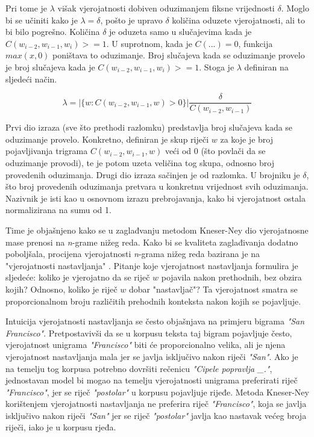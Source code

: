\documentclass[times, utf8, diplomski, numeric]{fer}
\begin{document}
Pri tome je $\lambda$ višak vjerojatnosti dobiven oduzimanjem fiksne vrijednosti $\delta$. Moglo bi se učiniti kako je $\lambda = \delta$, pošto je upravo $\delta$ količina oduzete vjerojatnosti, ali to bi bilo pogrešno. Količina $\delta$ je oduzeta samo u slučajevima kada je $C(w_{i - 2}, w_{i - 1}, w_i) >= 1$. U suprotnom, kada je $C(...) = 0$, funkcija $max(x, 0)$ poništava to oduzimanje. Broj slučajeva kada se oduzimanje provelo je broj slučajeva kada je $C(w_{i - 2}, w_{i - 1}, w_i) >= 1$. Stoga je $\lambda$ definiran na sljedeći način.

\[
\lambda = \left|\{w : C(w_{i - 2}, w_{i - 1}, w) > 0\}\right| \frac{\delta}{C(w_{i - 2}, w_{i - 1})} 
\]

Prvi dio izraza (sve što prethodi razlomku) predstavlja broj slučajeva kada se oduzimanje provelo. Konkretno, definiran je skup riječi $w$ za koje je broj pojavljivanja trigrama $C(w_{i - 2}, w_{i - 1}, w)$ veći od $0$ (što povlači da se oduzimanje provodi), te je potom uzeta veličina tog skupa, odnosno broj provedenih oduzimanja. Drugi dio izraza sačinjen je od razlomka. U brojniku je $\delta$, što broj provedenih oduzimanja pretvara u konkretnu vrijednost svih oduzimanja. Nazivnik je isti kao u osnovnom izrazu prebrojavanja, kako bi vjerojatnost ostala normalizirana na sumu od 1.

Time je objašnjeno kako se u zaglađvanju metodom Kneser-Ney dio vjerojatnosne mase prenosi na \textit{n}-grame nižeg reda. Kako bi se kvaliteta zaglađivanja dodatno poboljšala, procijena vjerojatnosti \textit{n}-grama nižeg reda bazirana je na "vjerojatnosti nastavljanja" . Pitanje koje vjerojatnost nastavljanja formulira je sljedeće: koliko je vjerojatno da se riječ $w$ pojavila nakon prethodnih, bez obzira kojih? Odnosno, koliko je riječ $w$ dobar "nastavljač"? Ta vjerojatnost smatra se proporcionalnom broju različitih prehodnih konteksta nakon kojih se pojavljuje.

Intuicija vjerojatnosti nastavljanja se često objašnjava na primjeru bigrama \textit{"San Francisco"}. Pretpostavivši da se u korpusu teksta taj bigram pojavljuje često, vjerojatnost unigrama \textit{"Francisco"} biti će proporcionalno velika, ali je njena vjerojatnost nastavljanja mala jer se javlja isključivo nakon riječi \textit{"San"}. Ako je na temelju tog korpusa potrebno dovršiti rečenicu \textit{"Cipele popravlja \_."}, jednostavan model bi mogao na temelju vjerojatnosti unigrama preferirati riječ \textit{"Francisco"}, jer se riječ \textit{"postolar"} u korpusu pojavljuje rijeđe. Metoda Kneser-Ney korištenjem vjerojatnosti nastavljanja ne preferira riječ \textit{"Francisco"}, koja se javlja isključivo nakon riječi \textit{"San"} jer se riječ \textit{"postolar"} javlja kao nastavak većeg broja riječi, iako je u korpusu rjeđa.
\end{document}
